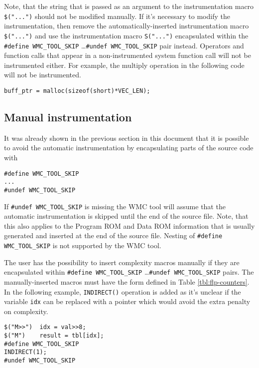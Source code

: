 Note, that the string that is passed as an argument to the instrumentation macro \verb|$("...")| should not be modified manually. If it's necessary to modify the instrumentation, then remove the automatically-inserted instrumentation macro \verb|$("...")| and use the instrumentation macro \verb|S("...")| encapsulated within the \verb|#define WMC_TOOL_SKIP| \ldots \verb|#undef WMC_TOOL_SKIP| pair instead. Operators and function calls that appear in a non-instrumented system function call will not be instrumented either. For example, the multiply operation in the following code will not be instrumented.	

\begin{Verbatim}[fontsize=\small]
buff_ptr = malloc(sizeof(short)*VEC_LEN);
\end{Verbatim}

\subsection{Manual instrumentation}

It was already shown in the previous section in this document that it is possible to avoid the automatic instrumentation by encapsulating parts of the source code with

\begin{Verbatim}[fontsize=\small]
#define WMC_TOOL_SKIP
...
#undef WMC_TOOL_SKIP
\end{Verbatim}

If \verb|#undef WMC_TOOL_SKIP| is missing the WMC tool will assume that the automatic instrumentation is skipped until the end of the source file. Note, that this also applies to the Program ROM and Data ROM information that is usually generated and inserted at the end of the source file. Nesting of \verb|#define WMC_TOOL_SKIP| is not supported by the WMC tool.

The user has the possibility to insert complexity macros manually if they are encapsulated within \verb|#define WMC_TOOL_SKIP| \ldots \verb|#undef WMC_TOOL_SKIP| pairs. The manually-inserted macros must have the form defined in Table \ref{tbl:flp-counters}. In the following example, \verb|INDIRECT()| operation is added as it's unclear if the variable \verb|idx| can be replaced with a pointer which would avoid the extra penalty on complexity.

\begin{Verbatim}[fontsize=\small]
$("M>>")  idx = val>>8;	
$("M")    result = tbl[idx];	
#define WMC_TOOL_SKIP
INDIRECT(1); 
#undef WMC_TOOL_SKIP
\end{Verbatim}

